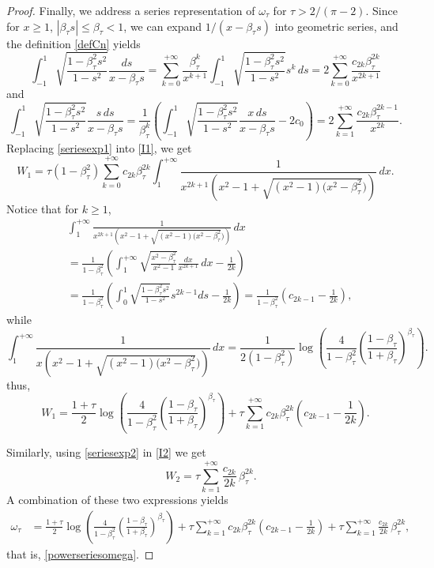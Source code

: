 \documentclass[reqno,11pt]{amsart}
\theoremstyle{plain}
\theoremstyle{definition}
\theoremstyle{remark}
\numberwithin{equation}{section}
\begin{document}
\begin{proof}
Finally, we address a series representation of $\omega_\tau$ for $\tau>2/(\pi-2)$. Since for $x\ge 1$, $|\beta_\tau s|\le \beta_\tau<1$, we can expand $1/(x-\beta_\tau s)$ into geometric series, and the definition \eqref{defCn} yields  
\begin{equation}
    \label{seriesexp1}
\int_{-1}^{1}\sqrt{\frac{1-\beta_\tau^2s^2}{1-s^2}}\frac{ds}{x-\beta_\tau s} =\sum_{k=0}^{+\infty} \frac{\beta_\tau^k}{x^{k+1}}\int_{-1}^{1}\sqrt{\frac{1-\beta_\tau^2s^2}{1-s^2}}s^k \,ds  = 2 \sum_{k=0}^{+\infty} \frac{  c_{2k} \beta_\tau^{2k}}{x^{2k+1}}  
\end{equation}
and
\begin{equation}
    \label{seriesexp2}
 \int_{-1}^{1}\sqrt{\frac{1-\beta_\tau^2s^2}{1-s^2}}\frac{s\, ds}{x-\beta_\tau s} =\frac{1}{\beta_\tau^k}\left( \int_{-1}^{1}\sqrt{\frac{1-\beta_\tau^2s^2}{1-s^2}}\frac{x\, ds}{x-\beta_\tau s} -2 c_0 \right)  =2 \sum_{k=1}^{+\infty} \frac{  c_{2k} \beta_\tau^{2k-1}}{x^{2k}}  .
\end{equation}
Replacing \eqref{seriesexp1} into \eqref{I1}, we get
$$
W_1= \tau(1-\beta_\tau^2) \sum_{k=0}^{+\infty}    c_{2k} \beta_\tau^{2k} \int_1^{+\infty} \frac{1}{x^{2k+1}   \left(   x^2-1 +\sqrt{ ( x^2-1)(x^2-\beta_\tau^2})\right) }   \,dx .
$$
Notice that for $k\ge 1$,
\begin{align*}
& \int_1^{+\infty} \frac{1}{x^{2k+1}   \left(   x^2-1 +\sqrt{ ( x^2-1)(x^2-\beta_\tau^2})\right) }   \,dx \\
&= \frac{1}{1-\beta_\tau^2} \left( \int_1^{+\infty} \sqrt{\frac{x^2-\beta_\tau^2}{x^2-1}} \frac{   dx }{x^{2k+1}   }   \,dx   - \frac{  1}{2k } \right)\\
&= \frac{1}{1-\beta_\tau^2} \left( \int_0^1 \sqrt{\frac{1-\beta_\tau^2 s^2}{1-s^2}} s^{2k-1}ds   - \frac{  1}{2k } \right) = \frac{1}{1-\beta_\tau^2} \left( c_{2k-1}    - \frac{  1}{2k } \right),
\end{align*}
while
$$
\int_1^{+\infty} \frac{1}{x    \left(   x^2-1 +\sqrt{ ( x^2-1)(x^2-\beta_\tau^2})\right) }   \,dx = \frac{1}{2
   \left(1-\beta_\tau^2\right)} \log \left(\frac{4}{1-\beta_\tau^2}
   \left(\frac{1-\beta_\tau}{1+\beta_\tau}\right)^{\beta_\tau}\right). 
$$
thus,
$$
W_1= \frac{1+\tau}{2}    \log \left(\frac{4}{1-\beta_\tau^2}
   \left(\frac{1-\beta_\tau}{1+\beta_\tau}\right)^{\beta_\tau}\right)+ \tau  \sum_{k=1}^{+\infty}    c_{2k} \beta_\tau^{2k} \left( c_{2k-1}    - \frac{  1}{2k } \right).
$$

Similarly, using \eqref{seriesexp2}  in \eqref{I2} we get
$$
\quad W_2  =  \tau    \sum_{k=1}^{+\infty}  \frac{c_{2k}}{2k}  \, \beta_\tau^{2k}  .
$$
A combination of these two expressions yields
\begin{align*}
\omega_\tau & =  \frac{1+\tau}{2}    \log \left(\frac{4}{1-\beta_\tau^2}
   \left(\frac{1-\beta_\tau}{1+\beta_\tau}\right)^{\beta_\tau}\right)+ \tau  \sum_{k=1}^{+\infty}    c_{2k} \beta_\tau^{2k} \left( c_{2k-1}    - \frac{  1}{2k } \right)+ \tau    \sum_{k=1}^{+\infty}  \frac{c_{2k}}{2k}  \, \beta_\tau^{2k} ,
\end{align*}
that is, \eqref{powerseriesomega}.


\end{proof}
\end{document}
